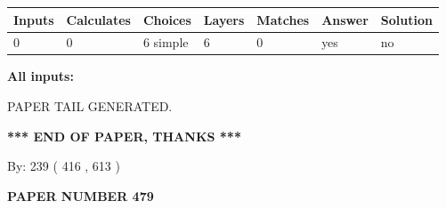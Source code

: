 \documentclass[12pt]{article}
\begin{document}
 
\noindent{}
 
 
   
   
   
   
\noindent\begin{tabular}{|l|l|l|l|l|l|l|}
 \hline
Inputs & Calculates & Choices & Layers & Matches & Answer & Solution \\ \hline
 0  & 
 0  & 
 6
  simple  
  & 
 6  & 
 0  & 
  yes & 
  no 
  \\ \hline
 \end{tabular}
   
   
   
   
\noindent{}
   
   
   
   
\noindent\vspace{0.1in}\hspace{-0.08in} {\textbf{\Large{All inputs: }}}
   
   
   
   
   
   
 \vspace{0.2in}
 
   
   
\vspace{2.0in} PAPER TAIL GENERATED.
   
   
   
   
\vspace{1.0in} 
{\textbf{\large{ *** END OF PAPER, THANKS *** }}} 
   
   
\hspace{1.0in} By: 
 239 ( 416 ,  613 )
   
   
   
   
\newpage 
\setcounter{page}{ 
   479001 } 
   
   
   
   
 {\textbf{ \Large{ PAPER NUMBER  479  }}}
   
   
\vspace{0.2in}
   
   
   
   
   
   
   
   
 \vspace{0.2in}
 
\end{document}
